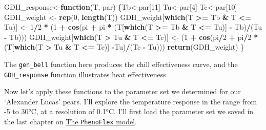 \documentclass[
]{book}
\newenvironment{Shaded}{\begin{snugshade}}{\end{snugshade}}
\newcommand{\ControlFlowTok}[1]{\textcolor[rgb]{0.13,0.29,0.53}{\textbf{#1}}}
\newcommand{\DecValTok}[1]{\textcolor[rgb]{0.00,0.00,0.81}{#1}}
\newcommand{\KeywordTok}[1]{\textcolor[rgb]{0.13,0.29,0.53}{\textbf{#1}}}
\newcommand{\NormalTok}[1]{#1}
\newcommand{\OperatorTok}[1]{\textcolor[rgb]{0.81,0.36,0.00}{\textbf{#1}}}
\newcommand{\StringTok}[1]{\textcolor[rgb]{0.31,0.60,0.02}{#1}}
\begin{document}
\begin{Shaded}
\begin{Highlighting}[]
\NormalTok{GDH_response<-}\ControlFlowTok{function}\NormalTok{(T, par)}
\NormalTok{\{Tb<-par[}\DecValTok{11}\NormalTok{]}
\NormalTok{ Tu<-par[}\DecValTok{4}\NormalTok{]}
\NormalTok{ Tc<-par[}\DecValTok{10}\NormalTok{]}
\NormalTok{ GDH_weight <-}\StringTok{ }\KeywordTok{rep}\NormalTok{(}\DecValTok{0}\NormalTok{, }\KeywordTok{length}\NormalTok{(T))}
\NormalTok{ GDH_weight[}\KeywordTok{which}\NormalTok{(T }\OperatorTok{>=}\StringTok{ }\NormalTok{Tb }\OperatorTok{&}\StringTok{ }\NormalTok{T }\OperatorTok{<=}\StringTok{ }\NormalTok{Tu)] <-}
\StringTok{   }\DecValTok{1}\OperatorTok{/}\DecValTok{2} \OperatorTok{*}\StringTok{ }\NormalTok{(}\DecValTok{1} \OperatorTok{+}\StringTok{ }\KeywordTok{cos}\NormalTok{(pi }\OperatorTok{+}\StringTok{ }\NormalTok{pi }\OperatorTok{*}\StringTok{ }\NormalTok{(T[}\KeywordTok{which}\NormalTok{(T }\OperatorTok{>=}\StringTok{ }\NormalTok{Tb }\OperatorTok{&}\StringTok{ }\NormalTok{T }\OperatorTok{<=}\StringTok{ }\NormalTok{Tu)] }\OperatorTok{-}\StringTok{ }\NormalTok{Tb)}\OperatorTok{/}\NormalTok{(Tu }\OperatorTok{-}\StringTok{ }\NormalTok{Tb)))}
\NormalTok{ GDH_weight[}\KeywordTok{which}\NormalTok{(T }\OperatorTok{>}\StringTok{ }\NormalTok{Tu }\OperatorTok{&}\StringTok{ }\NormalTok{T }\OperatorTok{<=}\StringTok{ }\NormalTok{Tc)] <-}
\StringTok{   }\NormalTok{(}\DecValTok{1} \OperatorTok{+}\StringTok{ }\KeywordTok{cos}\NormalTok{(pi}\OperatorTok{/}\DecValTok{2} \OperatorTok{+}\StringTok{ }\NormalTok{pi}\OperatorTok{/}\DecValTok{2} \OperatorTok{*}\StringTok{ }\NormalTok{(T[}\KeywordTok{which}\NormalTok{(T }\OperatorTok{>}\StringTok{  }\NormalTok{Tu }\OperatorTok{&}\StringTok{ }\NormalTok{T }\OperatorTok{<=}\StringTok{ }\NormalTok{Tc)] }\OperatorTok{-}\NormalTok{Tu)}\OperatorTok{/}\NormalTok{(Tc }\OperatorTok{-}\StringTok{ }\NormalTok{Tu)))}
  \KeywordTok{return}\NormalTok{(GDH_weight)}
\NormalTok{\}}
\end{Highlighting}
\end{Shaded}

The \texttt{gen\_bell} function here produces the chill effectiveness curve, and the \texttt{GDH\_response} function illustrates heat effectiveness.

Now let's apply these functions to the parameter set we determined for our `Alexander Lucas' pears. I'll explore the temperature response in the range from -5 to 30°C, at a resolution of 0.1°C. I'll first load the parameter set we saved in the last chapter on \protect\hyperlink{phenoflex}{The \texttt{PhenoFlex} model}.
\end{document}
